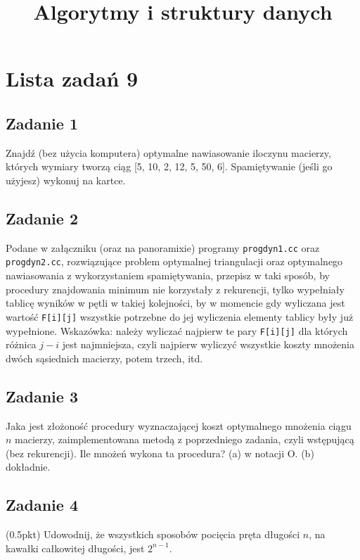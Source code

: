 \documentclass{article}
\begin{document}
\title{Algorytmy i struktury danych}
\author{}
\date{}
\maketitle

\section*{Lista zadań 9}

\subsection*{Zadanie 1}
Znajdź (bez użycia komputera) optymalne nawiasowanie iloczynu macierzy, których wymiary
tworzą ciąg [5, 10, 2, 12, 5, 50, 6]. Spamiętywanie (jeśli go użyjesz) wykonuj na kartce.

\subsection*{Zadanie 2}
Podane w załączniku (oraz na panoramixie) programy \verb|progdyn1.cc| oraz \verb|progdyn2.cc|,
rozwiązujące problem optymalnej triangulacji oraz optymalnego nawiasowania z wykorzystaniem
spamiętywania, przepisz w taki sposób, by procedury znajdowania minimum
nie korzystały z rekurencji, tylko wypełniały tablicę wyników w pętli w takiej kolejności,
by w momencie gdy wyliczana jest wartość \verb|F[i][j]| wszystkie potrzebne do jej wyliczenia
elementy tablicy były już wypełnione. Wskazówka: należy wyliczać najpierw te pary
\verb|F[i][j]| dla których różnica $j-i$ jest najmniejsza, czyli najpierw wyliczyć wszystkie
koszty mnożenia dwóch sąsiednich macierzy, potem trzech, itd.

\subsection*{Zadanie 3}
Jaka jest złożoność procedury wyznaczającej koszt optymalnego mnożenia ciągu
$n$ macierzy, zaimplementowana metodą z poprzedniego zadania, czyli wstępującą (bez rekurencji).
Ile mnożeń wykona ta procedura? (a) w notacji O. (b) dokładnie.

\subsection*{Zadanie 4}
(0.5pkt) Udowodnij, że wszystkich sposobów pocięcia pręta długości $n$, na kawałki całkowitej długości, jest $2^{n-1}$.
\end{document}
